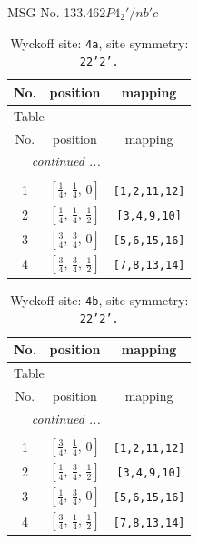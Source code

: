 \documentclass[fleqn,8pt]{jsarticle}
\begin{document}
\setcounter{MaxMatrixCols}{32}

\renewcommand{\tablename}{Table~}
\renewcommand{\figurename}{Figure~}
\begin{center}
\LARGE
MSG No. 133.462\quad$P4_{2}'/nb'c$
\end{center}
\renewcommand{\arraystretch}{1.2}
\begin{longtable}{ccc}
\caption{Wyckoff site: {\tt 4a}, site symmetry: {\tt 22'2'.}}
 \\
 \hline \hline
No. & position & mapping \\ \hline \endfirsthead

\multicolumn{2}{l}{\tablename\ \thetable{}} \\
 \hline \hline
No. & position & mapping \\ \hline \endhead

 \hline \hline
\multicolumn{2}{r}{\footnotesize\it continued ...} \\ \endfoot

 \hline \hline
\multicolumn{2}{r}{} \\ \endlastfoot

1 & $\left[ \frac{1}{4},\, \frac{1}{4},\, 0 \right]$ & {\tt [1,2,11,12]} \\ \hline
2 & $\left[ \frac{1}{4},\, \frac{1}{4},\, \frac{1}{2} \right]$ & {\tt [3,4,9,10]} \\ \hline
3 & $\left[ \frac{3}{4},\, \frac{3}{4},\, 0 \right]$ & {\tt [5,6,15,16]} \\ \hline
4 & $\left[ \frac{3}{4},\, \frac{3}{4},\, \frac{1}{2} \right]$ & {\tt [7,8,13,14]} \\
\end{longtable}
\renewcommand{\arraystretch}{1.2}
\begin{longtable}{ccc}
\caption{Wyckoff site: {\tt 4b}, site symmetry: {\tt 22'2'.}}
 \\
 \hline \hline
No. & position & mapping \\ \hline \endfirsthead

\multicolumn{2}{l}{\tablename\ \thetable{}} \\
 \hline \hline
No. & position & mapping \\ \hline \endhead

 \hline \hline
\multicolumn{2}{r}{\footnotesize\it continued ...} \\ \endfoot

 \hline \hline
\multicolumn{2}{r}{} \\ \endlastfoot

1 & $\left[ \frac{3}{4},\, \frac{1}{4},\, 0 \right]$ & {\tt [1,2,11,12]} \\ \hline
2 & $\left[ \frac{1}{4},\, \frac{3}{4},\, \frac{1}{2} \right]$ & {\tt [3,4,9,10]} \\ \hline
3 & $\left[ \frac{1}{4},\, \frac{3}{4},\, 0 \right]$ & {\tt [5,6,15,16]} \\ \hline
4 & $\left[ \frac{3}{4},\, \frac{1}{4},\, \frac{1}{2} \right]$ & {\tt [7,8,13,14]} \\
\end{longtable}
\end{document}
